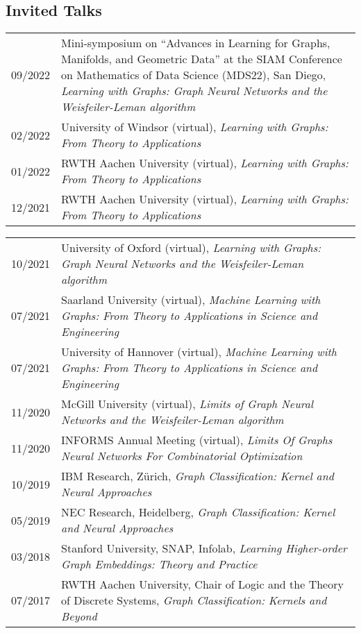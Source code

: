 \documentclass[11pt, a4paper, DIV=12]{scrartcl}
\begin{document}
\subsection*{Invited Talks}
\begin{tabular}{p{2.1cm}p{12.0cm}}
09/2022& Mini-symposium on ``Advances in Learning for Graphs, Manifolds, and Geometric Data'' at the SIAM Conference on Mathematics of Data Science (MDS22), San Diego, \emph{Learning with Graphs: Graph Neural Networks and the Weisfeiler-Leman algorithm}\\	
02/2022& University of Windsor (virtual), \emph{Learning with Graphs: From Theory to Applications}\\
01/2022&RWTH Aachen University (virtual), \emph{Learning with Graphs: From Theory to Applications}\\
12/2021&RWTH Aachen University (virtual), \emph{Learning with Graphs: From Theory to Applications}\\
\end{tabular}

\begin{tabular}{p{2.1cm}p{12.0cm}}
10/2021&University of Oxford (virtual), \emph{Learning with Graphs: Graph Neural Networks and the Weisfeiler-Leman algorithm}\\
07/2021&Saarland University (virtual), \emph{Machine Learning with Graphs:
	From Theory to Applications in Science and Engineering}\\
07/2021&University of Hannover (virtual), \emph{Machine Learning with Graphs:
	From Theory to Applications in Science and Engineering}\\
11/2020&McGill University (virtual), \emph{Limits of Graph Neural Networks and the Weisfeiler-Leman algorithm}\\
11/2020&INFORMS Annual Meeting (virtual), \emph{Limits Of Graphs Neural Networks For Combinatorial Optimization} \\
10/2019&IBM Research, Zürich, \emph{Graph Classification: Kernel and Neural Approaches}\\
05/2019&NEC Research, Heidelberg, \emph{Graph Classification: Kernel and Neural Approaches}\\ 
03/2018&Stanford University, SNAP, Infolab, \emph{Learning Higher-order Graph Embeddings: Theory and Practice}\\
07/2017&RWTH Aachen University, Chair of Logic and the Theory of Discrete Systems, \emph{Graph Classification: Kernels and Beyond}\\
\end{tabular}
\end{document}
